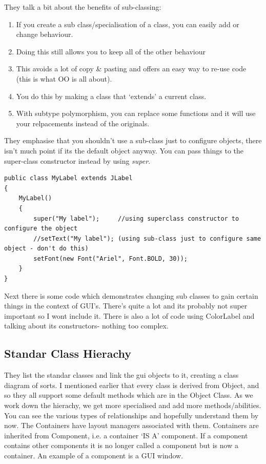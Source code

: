 \documentclass{article}
\begin{document}
They talk a bit about the benefits of sub-classing:
\begin{enumerate}
\item If you create a sub class/specialisation of a class, you can easily add or change behaviour.
\item Doing this still allows you to keep all of the other behaviour
\item This avoids a lot of copy \& pasting and offers an easy way to re-use code (this is what OO
      is all about).
\item You do this by making a class that `extends' a current class.
\item With subtype polymorphism, you can replace some functions and it will use your relpacements
      instead of the originals.
\end{enumerate}

They emphasise that you shouldn't use a sub-class just to configure objects, there isn't much point
if its the default object anyway. You can pass things to the super-class constructor instead by
using \emph{super}. 
\newline
\newline
\begin{lstlisting}
public class MyLabel extends JLabel
{
	MyLabel()
	{
		super("My label");     //using superclass constructor to configure the object
		//setText("My label"); (using sub-class just to configure same object - don't do this) 
		setFont(new Font("Ariel", Font.BOLD, 30));
	}
}
\end{lstlisting}

Next there is some code which demonstrates changing sub classes to gain certain things in the context
of GUI's. There's quite a lot and its probably not super important so I wont include it. There is also 
a lot of code using ColorLabel and talking about its constructors- nothing too complex.

\subsection{Standar Class Hierachy}

They list the standar classes and link the gui objects to it, creating a class diagram of sorts.
I mentioned earlier that every class is derived from Object, and so they all support some 
default methods which are in the Object Class. As we work down the hierachy, we get more
specialised and add more methods/abilities. You can see the various types of relationships
and hopefully understand them by now. The Containers have layout managers associated with them. 
Containers are inherited from Component, i.e. a container `IS A' component. If a component contains
other components it is no longer called a component but is now a container. An example of a component
is a GUI window.
\end{document}
